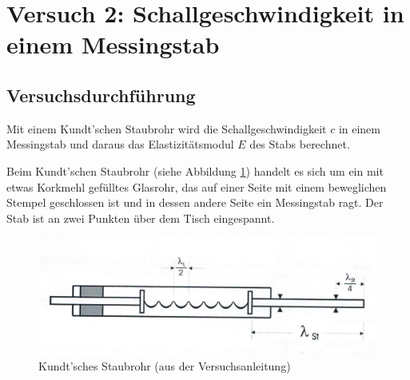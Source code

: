 \documentclass{scrartcl}
\begin{document}
\section{Versuch 2: Schallgeschwindigkeit in einem Messingstab}
\subsection{Versuchsdurchführung}
Mit einem Kundt'schen Staubrohr wird die Schallgeschwindigkeit $c$ in einem Messingstab und daraus das Elastizitätsmodul $E$ des Stabs berechnet.

Beim Kundt'schen Staubrohr (siehe Abbildung \ref{fig:Kundt}) handelt es sich um ein mit etwas Korkmehl gefülltes Glasrohr, das auf einer Seite mit einem beweglichen Stempel geschlossen ist und in dessen andere Seite ein Messingstab ragt. Der Stab ist an zwei Punkten über dem Tisch eingespannt.

\begin{figure}[h]
  \centering
    \includegraphics[scale=0.50]{Kundt.PNG}
  \caption{Kundt'sches Staubrohr (aus der Versuchsanleitung)}
  \label{fig:Kundt}
\end{figure}
\end{document}
